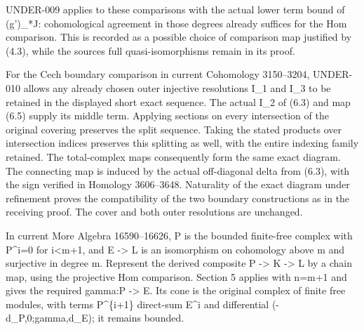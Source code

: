 UNDER-009 applies to these comparisons with the actual lower term bound of (g')\allowbreak{}\_\allowbreak{}*J:\allowbreak{} cohomological agreement in those degrees already suffices for the Hom comparison. This is recorded as a possible choice of comparison map justified by (4.3)\allowbreak{},\allowbreak{} while the source\textquotesingle s full quasi-isomorphisms remain in its proof.

For the Cech boundary comparison in current Cohomology 3150–\allowbreak{}3204,\allowbreak{} UNDER-010 allows any already chosen outer injective resolutions I\_\allowbreak{}1 and I\_\allowbreak{}3 to be retained in the displayed short exact sequence. The actual I\_\allowbreak{}2 of (6.3)\allowbreak{} and map (6.5)\allowbreak{} supply its middle term. Applying sections on every intersection of the original covering preserves the split sequence. Taking the stated products over intersection indices preserves this splitting as well,\allowbreak{} with the entire indexing family retained. The total-complex maps consequently form the same exact diagram. The connecting map is induced by the actual off-diagonal delta\textquotesingle{} from (6.3)\allowbreak{},\allowbreak{} with the sign verified in Homology 3606–\allowbreak{}3648. Naturality of the exact diagram under refinement proves the compatibility of the two boundary constructions as in the receiving proof. The cover and both outer resolutions are unchanged.

In current More Algebra 16590–\allowbreak{}16626,\allowbreak{} P is the bounded finite-free complex with P\textasciicircum{}i\allowbreak{}=0 for i<m\allowbreak{}+1,\allowbreak{} and E \allowbreak{}-> L is an isomorphism on cohomology above m and surjective in degree m. Represent the derived composite P \allowbreak{}-> K \allowbreak{}-> L by a chain map,\allowbreak{} using the projective Hom comparison. Section 5 applies with n\allowbreak{}=m\allowbreak{}+1 and gives the required gamma:\allowbreak{}P \allowbreak{}-> E. Its cone is the original complex of finite free modules,\allowbreak{} with terms P\textasciicircum{}\{i\allowbreak{}+1\} direct-sum E\^{}i and differential (-d\_\allowbreak{}P,\allowbreak{}0;gamma,\allowbreak{}d\_\allowbreak{}E)\allowbreak{}; it remains bounded.


